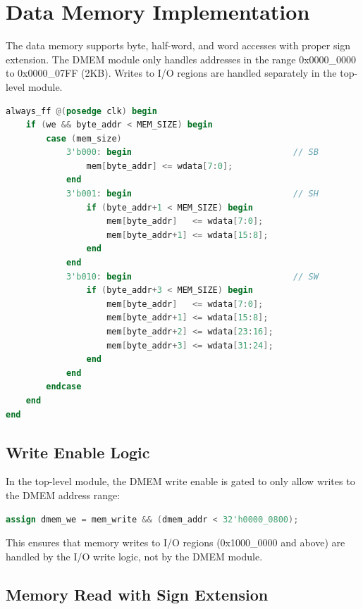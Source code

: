 \section{Data Memory Implementation}

The data memory supports byte, half-word, and word accesses with proper sign extension. The DMEM module only handles addresses in the range 0x0000\_0000 to 0x0000\_07FF (2KB). Writes to I/O regions are handled separately in the top-level module.

\begin{lstlisting}[language=Verilog, caption=Data Memory Write]
always_ff @(posedge clk) begin
    if (we && byte_addr < MEM_SIZE) begin
        case (mem_size)
            3'b000: begin                                // SB
                mem[byte_addr] <= wdata[7:0];
            end
            3'b001: begin                                // SH
                if (byte_addr+1 < MEM_SIZE) begin
                    mem[byte_addr]   <= wdata[7:0];
                    mem[byte_addr+1] <= wdata[15:8];
                end
            end
            3'b010: begin                                // SW
                if (byte_addr+3 < MEM_SIZE) begin
                    mem[byte_addr]   <= wdata[7:0];
                    mem[byte_addr+1] <= wdata[15:8];
                    mem[byte_addr+2] <= wdata[23:16];
                    mem[byte_addr+3] <= wdata[31:24];
                end
            end
        endcase
    end
end
\end{lstlisting}

\subsection{Write Enable Logic}

In the top-level module, the DMEM write enable is gated to only allow writes to the DMEM address range:

\begin{lstlisting}[language=Verilog, caption=DMEM Write Enable Gating]
assign dmem_we = mem_write && (dmem_addr < 32'h0000_0800);
\end{lstlisting}

This ensures that memory writes to I/O regions (0x1000\_0000 and above) are handled by the I/O write logic, not by the DMEM module.

\subsection{Memory Read with Sign Extension}

